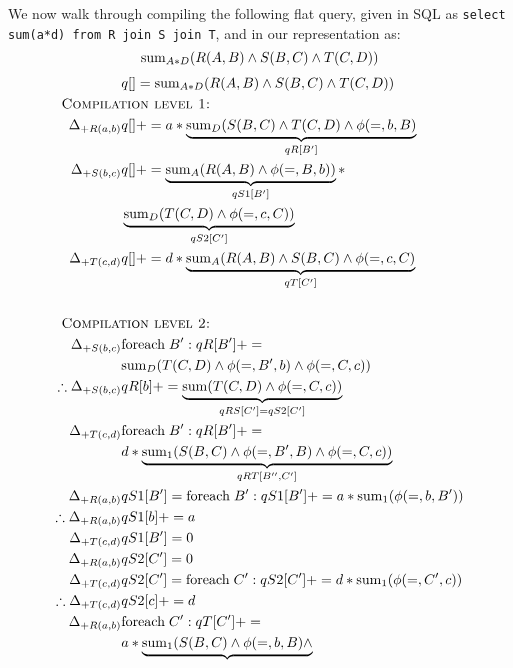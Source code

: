 \begin{example}
We now walk through compiling the following flat query, given in SQL as
\texttt{select sum(a*d) from R join S join T}, and in our representation as:
\[\mathrm{sum}_{A*D}(R(A,B) \wedge S(B,C) \wedge T(C,D))\]
\begin{align*}
& q[] = \algsum_{A*D}(R(A,B) \wedge S(B,C) \wedge T(C,D))\\
& \hspace{-1.5cm}\mbox{\sc Compilation level 1:}\\
\Delta_{+R(a,b)} & q[] +=
a * \underbrace{\algsum_{D}(S(B,C) \wedge T(C,D) \wedge \phi(=,b,B)}_{qR[B']}\\
\Delta_{+S(b,c)} & q[] +=
\underbrace{\algsum_{A}(R(A,B) \wedge \phi(=,B,b))}_{qS1[B']} * \\
& \underbrace{\algsum_{D}(T(C,D) \wedge \phi(=,c,C))}_{qS2[C']}\\
\Delta_{+T(c,d)} & q[] +=
d * \underbrace{\algsum_{A}(R(A,B) \wedge S(B,C) \wedge \phi(=,c,C)}_{qT[C']}\\
\\
& \hspace{-1.5cm}\mbox{\sc Compilation level 2:}\\
\Delta_{+S(b,c)} & \algforeach \; B': qR[B'] += \\
& \algsum_{D}(T(C,D) \wedge \phi(=,B',b) \wedge \phi(=,C,c))
 \\
\therefore \Delta_{+S(b,c)} & qR[b] +=
\underbrace{\algsum(T(C,D) \wedge \phi(=,C,c))}_{qRS[C'] = qS2[C']}
\\
\Delta_{+T(c,d)} & \algforeach \; B': qR[B'] +=  \\
& d * \underbrace{\algsum_{1}(S(B,C) \wedge \phi(=,B',B) \wedge
  \phi(=,C,c))}_{qRT[B'',C']}
\\
\Delta_{+R(a,b)} & qS1[B'] = \algforeach \; B': qS1[B'] +=
a * \algsum_{1}(\phi(=,b,B'))
\\
\therefore \Delta_{+R(a,b)} & qS1[b] += a \\
\Delta_{+T(c,d)} & qS1[B'] = 0 \\
\Delta_{+R(a,b)} & qS2[C'] = 0 \\
\Delta_{+T(c,d)} & qS2[C'] = \algforeach \; C': qS2[C'] +=
d * \algsum_{1}(\phi(=,C',c))
\\
\therefore \Delta_{+T(c,d)} & qS2[c] += d\\
\Delta_{+R(a,b)} & \algforeach \; C': qT[C'] += \\
& a * \underbrace{\algsum_{1}(S(B,C) \wedge \phi(=,b,B) \wedge
}
\end{align*}
\end{example}
